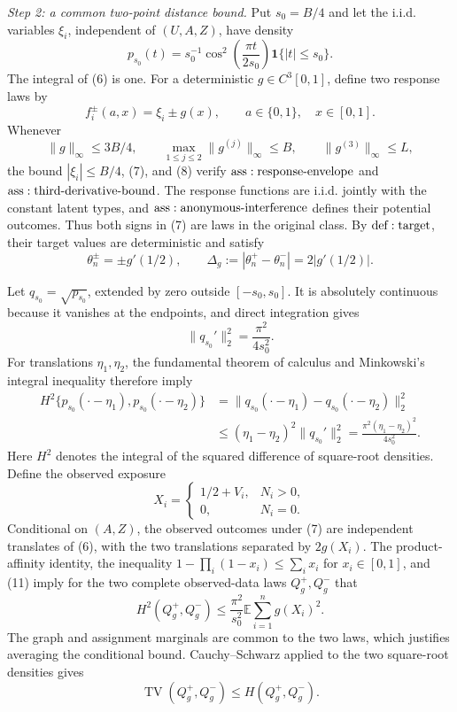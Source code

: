 \textit{Step 2: a common two-point distance bound.}
Put \(s_0=B/4\) and let the i.i.d. variables \(\xi_i\), independent of \((U,A,Z)\), have density
\[
 p_{s_0}(t)=s_0^{-1}\cos^2\!\left(\frac{\pi t}{2s_0}\right)
 \mathbf1\{|t|\leq s_0\}.
\tag{6}
\]
The integral of (6) is one.  For a deterministic \(g\in C^3[0,1]\), define two response laws by
\[
 f_i^\pm(a,x)=\xi_i\pm g(x),
 \qquad a\in\{0,1\},\quad x\in[0,1].
\tag{7}
\]
Whenever
\[
 \|g\|_\infty\leq 3B/4,
 \qquad
 \max_{1\leq j\leq2}\|g^{(j)}\|_\infty\leq B,
 \qquad
 \|g^{(3)}\|_\infty\leq L,
\tag{8}
\]
the bound \(|\xi_i|\leq B/4\), (7), and (8) verify \({\rm ass:response\text{-}envelope}\) and \({\rm ass:third\text{-}derivative\text{-}bound}\).  The response functions are i.i.d. jointly with the constant latent types, and \({\rm ass:anonymous\text{-}interference}\) defines their potential outcomes.  Thus both signs in (7) are laws in the original class.  By \({\rm def:target}\), their target values are deterministic and satisfy
\[
 \theta_n^\pm=\pm g'(1/2),
 \qquad
 \Delta_g:=|\theta_n^+-\theta_n^-|=2|g'(1/2)|.
\tag{9}
\]

Let \(q_{s_0}=\sqrt{p_{s_0}}\), extended by zero outside \([-s_0,s_0]\).  It is absolutely continuous because it vanishes at the endpoints, and direct integration gives
\[
 \|q_{s_0}'\|_2^2
 =\frac{\pi^2}{4s_0^2}.
\tag{10}
\]
For translations \(\eta_1,\eta_2\), the fundamental theorem of calculus and Minkowski's integral inequality therefore imply
\[
 \begin{aligned}
 H^2\{p_{s_0}(\mathord\cdot-\eta_1),p_{s_0}(\mathord\cdot-\eta_2)\}
 &=\|q_{s_0}(\mathord\cdot-\eta_1)-q_{s_0}(\mathord\cdot-\eta_2)\|_2^2\\
 &\leq (\eta_1-\eta_2)^2\|q_{s_0}'\|_2^2
 =\frac{\pi^2(\eta_1-\eta_2)^2}{4s_0^2}.
\end{aligned}
\tag{11}
\]
Here \(H^2\) denotes the integral of the squared difference of square-root densities.  Define the observed exposure
\[
 X_i=\begin{cases}1/2+V_i,&N_i>0,\\0,&N_i=0.\end{cases}
\tag{12}
\]
Conditional on \((A,Z)\), the observed outcomes under (7) are independent translates of (6), with the two translations separated by \(2g(X_i)\).  The product-affinity identity, the inequality \(1-\prod_i(1-x_i)\leq\sum_i x_i\) for \(x_i\in[0,1]\), and (11) imply for the two complete observed-data laws \(Q_g^+,Q_g^-\) that
\[
 H^2(Q_g^+,Q_g^-)
 \leq \frac{\pi^2}{s_0^2}\mathbb E\sum_{i=1}^ng(X_i)^2.
\tag{13}
\]
The graph and assignment marginals are common to the two laws, which justifies averaging the conditional bound.  Cauchy--Schwarz applied to the two square-root densities gives
\[
 \operatorname{TV}(Q_g^+,Q_g^-)\leq H(Q_g^+,Q_g^-).
\tag{14}
\]

